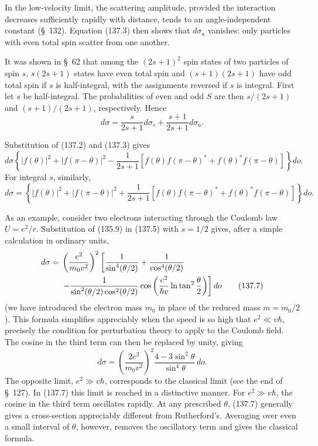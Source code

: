 In the low-velocity limit, the scattering amplitude, provided the interaction decreases sufficiently rapidly with distance, tends to an angle-independent constant (\S~132). Equation (137.3) then shows that $d\sigma_a$ vanishes: only particles with even total spin scatter from one another.



It was shown in \S~62 that among the $(2s+1)^2$ spin states of two particles of spin $s$, $s(2s+1)$ states have even total spin and $(s+1)(2s+1)$ have odd total spin if $s$ is half-integral, with the assignments reversed if $s$ is integral. First let $s$ be half-integral. The probabilities of even and odd $S$ are then $s/(2s+1)$ and $(s+1)/(2s+1)$, respectively. Hence
\begin{equation}
 d\sigma=\frac{s}{2s+1}d\sigma_s+\frac{s+1}{2s+1}d\sigma_a.
 \tag{137.4}
\end{equation}

Substitution of (137.2) and (137.3) gives
\begin{equation}
 d\sigma\left\{|f(\theta)|^2+|f(\pi-\theta)|^2
 -\frac1{2s+1}[f(\theta)f(\pi-\theta)^*+f(\theta)^*f(\pi-\theta)]\right\}d o.
 \tag{137.5}
\end{equation}
For integral $s$, similarly,
\begin{equation}
 d\sigma=\left\{|f(\theta)|^2+|f(\pi-\theta)|^2
 +\frac1{2s+1}[f(\theta)f(\pi-\theta)^*+f(\theta)^*f(\pi-\theta)]\right\}d o.
 \tag{137.6}
\end{equation}

As an example, consider two electrons interacting through the Coulomb law $U=e^2/r$. Substitution of (135.9) in (137.5) with $s=1/2$ gives, after a simple calculation in ordinary units,
\begin{align}
 d\sigma={}&\left(\frac{e^2}{m_0v^2}\right)^2
 \left[\frac1{\sin^4(\theta/2)}+\frac1{\cos^4(\theta/2)}\right.\notag\\
 &\left.-\frac1{\sin^2(\theta/2)\cos^2(\theta/2)}
 \cos\left(\frac{e^2}{\hbar v}\ln\tan^2\frac\theta2\right)\right]d o
 \tag{137.7}
\end{align}
(we have introduced the electron mass $m_0$ in place of the reduced mass $m=m_0/2$). This formula simplifies appreciably when the speed is so high that $e^2\ll v\hbar$, precisely the condition for perturbation theory to apply to the Coulomb field. The cosine in the third term can then be replaced by unity, giving
\begin{equation}
 d\sigma=\left(\frac{2e^2}{m_0v^2}\right)^2\frac{4-3\sin^2\theta}{\sin^4\theta}\,d o.
 \tag{137.8}
\end{equation}
The opposite limit, $e^2\gg v\hbar$, corresponds to the classical limit (see the end of \S~127). In (137.7) this limit is reached in a distinctive manner. For $e^2\gg v\hbar$, the cosine in the third term oscillates rapidly. At any prescribed $\theta$, (137.7) generally gives a cross-section appreciably different from Rutherford's. Averaging over even a small interval of $\theta$, however, removes the oscillatory term and gives the classical formula.

